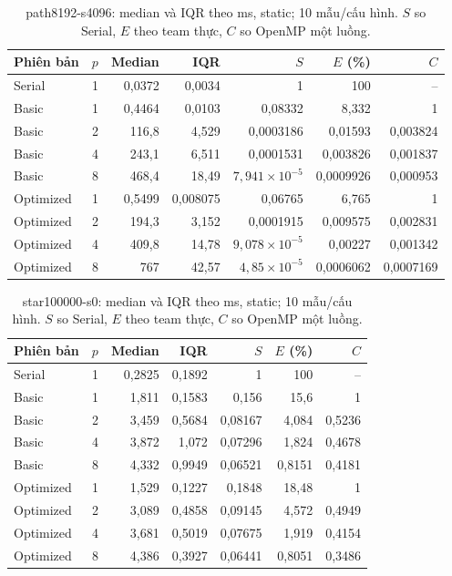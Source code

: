 \begin{table}[htbp]
\centering\small
\caption[path8192-s4096: thống kê static]{path8192-s4096: median và IQR theo ms, static; 10 mẫu/cấu hình. $S$ so Serial, $E$ theo team thực, $C$ so OpenMP một luồng.}
\label{tab:path8192-s4096}
\begin{tabular}{lrrrrrr}
\toprule
Phiên bản & $p$ & Median & IQR & $S$ & $E$ (\%) & $C$ \\
\midrule
Serial & 1 & 0,0372 & 0,0034 & 1 & 100 & -- \\
Basic & 1 & 0,4464 & 0,0103 & 0,08332 & 8,332 & 1 \\
Basic & 2 & 116,8 & 4,529 & 0,0003186 & 0,01593 & 0,003824 \\
Basic & 4 & 243,1 & 6,511 & 0,0001531 & 0,003826 & 0,001837 \\
Basic & 8 & 468,4 & 18,49 & $7,941\times10^{-5}$ & 0,0009926 & 0,000953 \\
Optimized & 1 & 0,5499 & 0,008075 & 0,06765 & 6,765 & 1 \\
Optimized & 2 & 194,3 & 3,152 & 0,0001915 & 0,009575 & 0,002831 \\
Optimized & 4 & 409,8 & 14,78 & $9,078\times10^{-5}$ & 0,00227 & 0,001342 \\
Optimized & 8 & 767 & 42,57 & $4,85\times10^{-5}$ & 0,0006062 & 0,0007169 \\
\bottomrule
\end{tabular}
\end{table}

\begin{table}[htbp]
\centering\small
\caption[star100000-s0: thống kê static]{star100000-s0: median và IQR theo ms, static; 10 mẫu/cấu hình. $S$ so Serial, $E$ theo team thực, $C$ so OpenMP một luồng.}
\label{tab:star100000-s0}
\begin{tabular}{lrrrrrr}
\toprule
Phiên bản & $p$ & Median & IQR & $S$ & $E$ (\%) & $C$ \\
\midrule
Serial & 1 & 0,2825 & 0,1892 & 1 & 100 & -- \\
Basic & 1 & 1,811 & 0,1583 & 0,156 & 15,6 & 1 \\
Basic & 2 & 3,459 & 0,5684 & 0,08167 & 4,084 & 0,5236 \\
Basic & 4 & 3,872 & 1,072 & 0,07296 & 1,824 & 0,4678 \\
Basic & 8 & 4,332 & 0,9949 & 0,06521 & 0,8151 & 0,4181 \\
Optimized & 1 & 1,529 & 0,1227 & 0,1848 & 18,48 & 1 \\
Optimized & 2 & 3,089 & 0,4858 & 0,09145 & 4,572 & 0,4949 \\
Optimized & 4 & 3,681 & 0,5019 & 0,07675 & 1,919 & 0,4154 \\
Optimized & 8 & 4,386 & 0,3927 & 0,06441 & 0,8051 & 0,3486 \\
\bottomrule
\end{tabular}
\end{table}

